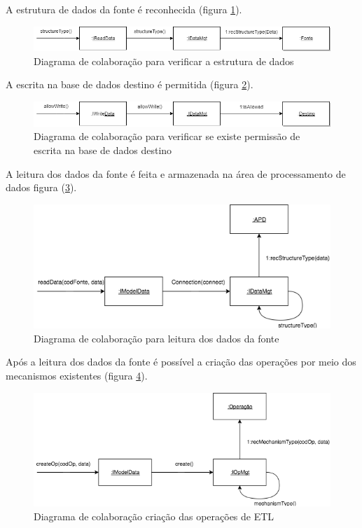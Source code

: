 A estrutura de dados da fonte é reconhecida (figura \ref{colaboracao2}).

\begin{figure}[h!]
	\centering
	\includegraphics[scale=0.5]{fig/colaboracao2.png}
	\caption{Diagrama de colaboração para verificar a estrutura de dados}
	\label{colaboracao2}
\end{figure}

A escrita na base de dados destino é permitida (figura \ref{colaboracao3}).

\begin{figure}[h!]
	\centering
	\includegraphics[scale=0.5]{fig/colaboracao3.png}
	\caption{Diagrama de colaboração para verificar se existe permissão de escrita na base de dados destino}
	\label{colaboracao3}
\end{figure}

A leitura dos dados da fonte é feita e armazenada na área de processamento de dados figura (\ref{readData}).

\begin{figure}[h!]
	\centering
	\includegraphics[scale=0.5]{fig/readData.png}
	\caption{Diagrama de colaboração para leitura dos dados da fonte}
	\label{readData}
\end{figure}

Após a leitura dos dados da fonte é possível a criação das operações por meio dos mecanismos existentes (figura \ref{createOp}).

\begin{figure}[h!]
	\centering
	\includegraphics[scale=0.5]{fig/createOp.png}
	\caption{Diagrama de colaboração criação das operações de ETL}
	\label{createOp}
\end{figure}

